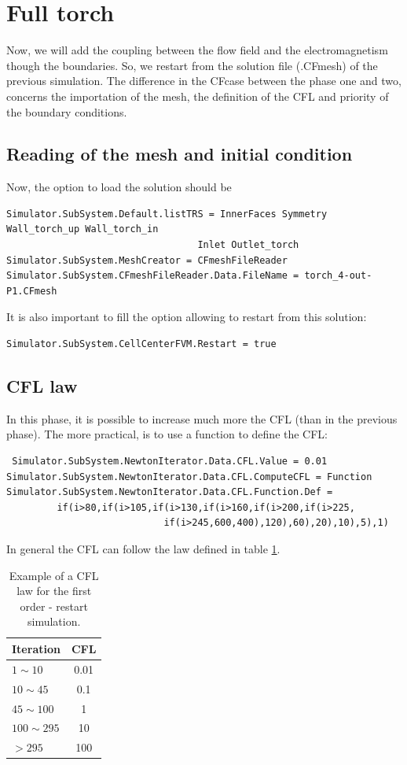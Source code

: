\documentclass[11pt]{article}
\begin{document}
\section{Full torch}
Now, we will add the coupling between the flow field and the electromagnetism though the boundaries. So,
we restart from the solution file (.CFmesh) of the previous simulation.
The difference in the CFcase between the phase one and two, concerns the importation of the mesh, the definition
of the CFL and priority of the boundary conditions.

\subsection{Reading of the mesh and initial condition}
Now, the option to load the solution should be 
\begin{verbatim}
Simulator.SubSystem.Default.listTRS = InnerFaces Symmetry Wall_torch_up Wall_torch_in
                                  Inlet Outlet_torch
Simulator.SubSystem.MeshCreator = CFmeshFileReader
Simulator.SubSystem.CFmeshFileReader.Data.FileName = torch_4-out-P1.CFmesh
\end{verbatim}
It is also important to fill the option allowing to restart from this solution:
\begin{verbatim}
Simulator.SubSystem.CellCenterFVM.Restart = true
\end{verbatim}

\subsection{CFL law}
In this phase, it is possible to increase much more the CFL (than in the previous phase). The more practical,
is to use a function to define the CFL:
\begin{verbatim}
 Simulator.SubSystem.NewtonIterator.Data.CFL.Value = 0.01
Simulator.SubSystem.NewtonIterator.Data.CFL.ComputeCFL = Function 
Simulator.SubSystem.NewtonIterator.Data.CFL.Function.Def = 
         if(i>80,if(i>105,if(i>130,if(i>160,if(i>200,if(i>225,
                            if(i>245,600,400),120),60),20),10),5),1)
\end{verbatim}
In general the CFL can follow the law defined in table \ref{tab:cfl_torch_fir}.
\begin{table}[htb]
\centering
\begin{tabular}{lc}
\textbf{Iteration} & \textbf{CFL} \\ \hline
$1 \sim 10 $ & 0.01 \\ \hline
$10 \sim 45 $ & 0.1 \\ \hline
$45 \sim 100 $ & 1 \\ \hline
$100 \sim 295 $ & 10 \\ \hline
$>295$ & 100 \\ 
\hline
\end{tabular}
\caption{Example of a CFL law for the first order - restart simulation.}
\label{tab:cfl_torch_fir}
\end{table}
\end{document}
